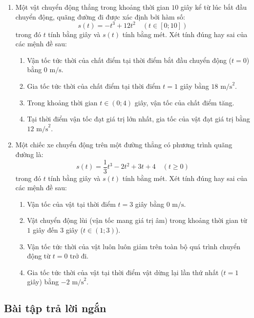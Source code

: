 \documentclass[12pt]{article}
\begin{document}
\begin{enumerate}[label=\textbf{Câu \arabic*.}]
		\item Một vật chuyển động thẳng trong khoảng thời gian $10$ giây kể từ lúc bắt đầu chuyển động, quãng đường đi được xác định bởi hàm số:
		$$s(t) = -t^3 + 12t^2 \quad (t \in [0; 10])$$
		trong đó $t$ tính bằng giây và $s(t)$ tính bằng mét. Xét tính đúng hay sai của các mệnh đề sau:
		\begin{enumerate}[label=\alph*)]
			\item Vận tốc tức thời của chất điểm tại thời điểm bắt đầu chuyển động ($t = 0$) bằng $0$ $\text{m/s}$.
			\item Gia tốc tức thời của chất điểm tại thời điểm $t = 1$ giây bằng $18$ $\text{m/s}^2$.
			\item Trong khoảng thời gian $t \in (0; 4)$ giây, vận tốc của chất điểm tăng.
			\item Tại thời điểm vận tốc đạt giá trị lớn nhất, gia tốc của vật đạt giá trị bằng $12$ $\text{m/s}^2$.
		\end{enumerate}
		
		\item Một chiếc xe chuyển động trên một đường thẳng có phương trình quãng đường là:
		$$s(t) = \dfrac{1}{3}t^3 - 2t^2 + 3t + 4 \quad (t \ge 0)$$
		trong đó $t$ tính bằng giây và $s(t)$ tính bằng mét. Xét tính đúng hay sai của các mệnh đề sau:
		\begin{enumerate}[label=\alph*)]
			\item Vận tốc của vật tại thời điểm $t = 3$ giây bằng $0$ $\text{m/s}$.
			\item Vật chuyển động lùi (vận tốc mang giá trị âm) trong khoảng thời gian từ $1$ giây đến $3$ giây ($t \in (1; 3)$).
			\item Vận tốc tức thời của vật luôn luôn giảm trên toàn bộ quá trình chuyển động từ $t = 0$ trở đi.
			\item Gia tốc tức thời của vật tại thời điểm vật dừng lại lần thứ nhất ($t = 1$ giây) bằng $-2$ $\text{m/s}^2$.
		\end{enumerate}
		
	\end{enumerate}
	
	
	\subsection{Bài tập trả lời ngắn}
	
\end{document}
